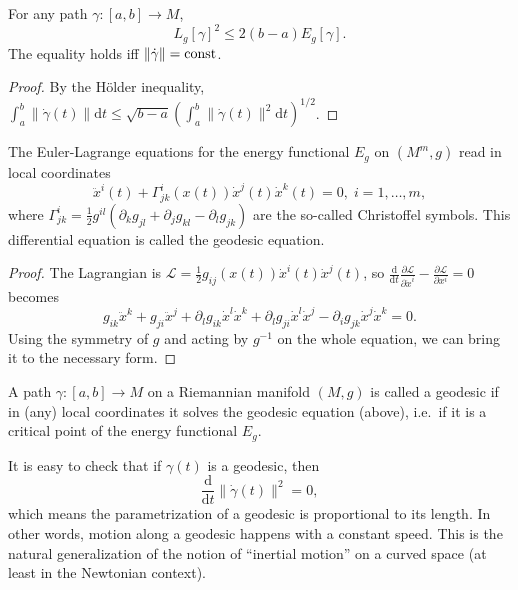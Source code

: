 \documentclass[english,letterpaper]{article}%
\numberwithin{equation}{section}
\numberwithin{figure}{section}
\numberwithin{table}{section}
\theoremstyle{definition}
\theoremstyle{definition}
\theoremstyle{definition}
\theoremstyle{plain}
\theoremstyle{plain}
\theoremstyle{plain}
\theoremstyle{plain}
\theoremstyle{remark}
\theoremstyle{remark}
\newcommand{\dd}{{\mathrm{d}}}
\renewcommand{\leq}{\leqslant}
\newcommand{\Lie}{\mathcal{L}}
\begin{document}
\begin{lem}\label{length<energy lemma}
For any path $\gamma:[a,b]\to M$, 
\[L_g[\gamma]^2\leq 2(b-a)E_g[\gamma].\] The equality holds iff $\lVert \dot\gamma \rVert ={\rm const}$.
\end{lem}
\begin{proof}
    By the H\"older inequality, $\int_a^b \lVert \dot\gamma(t)\rVert \dd t\leq \sqrt{b-a} \left(\int_a^b \lVert \dot\gamma(t)\rVert^2\dd t\right)^{1/2}$.
\end{proof}

\begin{lem}
    The Euler-Lagrange equations for the energy functional $E_g$ on $(M^m,g)$ read in local coordinates 
    \[\ddot x^i(t)+\Gamma^i_{jk}(x(t))\dot x^j(t)\dot x^k(t)=0,\; i=1,\ldots,m,\]
    where $\Gamma^i_{jk}=\frac 12 g^{il}(\partial_k g_{jl}+\partial_jg_{kl}-\partial_l g_{jk})$ are the so-called Christoffel symbols. This differential equation is called the geodesic equation.
\end{lem}
\begin{proof}
    The Lagrangian is $\Lie=\frac12 g_{ij}(x(t))\dot x^i(t)\dot x^j(t)$, so $\frac{\dd}{\dd t}\frac{\partial\Lie}{\partial \dot x^i}-\frac{\partial \Lie}{\partial x^i}=0$ becomes 
    \[g_{ik}\ddot x^k+g_{ji}\ddot x^j+\partial_l g_{ik}\dot x^l\dot x^k+\partial_l g_{ji}\dot x^l\dot x^j-\partial_i g_{jk}\dot x^j\dot x^k=0.\]
    Using the symmetry of $g$ and acting by $g^{-1}$ on the whole equation, we can bring it to the necessary form.
\end{proof}

\begin{defn}[Geodesic]
    A path $\gamma:[a,b]\to M$ on a Riemannian manifold $(M,g)$ is called a geodesic if in (any) local coordinates it solves the geodesic equation (above), i.e.\ if it is a critical point of the energy functional $E_g$.
\end{defn}

It is easy to check that if $\gamma(t)$ is a geodesic, then 
\[\frac{\dd}{\dd t}\lVert \dot\gamma(t)\rVert^2=0,\]
which means the parametrization of a geodesic is proportional to its length. In other words, motion along a geodesic happens with a constant speed. This is the natural generalization of the notion of ``inertial motion'' on a curved space (at least in the Newtonian context).
\end{document}

